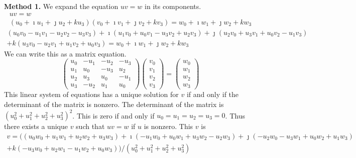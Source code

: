 {%
\begin{Solution}
  \label{solution quaternion}
  \textbf{Method 1.}
  We expand the equation $u v = w$ in its components.
  \begin{gather*}
    u v = w 
    \\
    \left( u_0 + \imath u_1 + \jmath u_2 + k u_3 \right) 
    \left(v_0 + \imath v_1 + \jmath v_2 + k v_3 \right) 
    = w_0 + \imath w_1 + \jmath w_2 + k w_3 
  \end{gather*}
  \begin{multline*}
    \left( u_0 v_0 - u_1 v_1 - u_2 v_2 - u_3 v_3 \right)
    + \imath \left( u_1 v_0 + u_0 v_1 - u_3 v_2 + u_2 v_3 \right)
    + \jmath \left( u_2 v_0 + u_3 v_1 + u_0 v_2 - u_1 v_3 \right) 
    \\
    + k \left( u_3 v_0 - u_2 v_1 + u_1 v_2 + u_0 v_3 \right)
    = w_0 + \imath w_1 + \jmath w_2 + k w_3 
  \end{multline*}
  We can write this as a matrix equation.
  \[
  \begin{pmatrix}
    u_0  & - u_1 & - u_2 & - u_3 \\
    u_1  &   u_0 & - u_3 &   u_2 \\
    u_2  &   u_3 &   u_0 & - u_1 \\
    u_3  & - u_2 &   u_1 &   u_0 
  \end{pmatrix}
  \begin{pmatrix}
    v_0 \\
    v_1 \\
    v_2 \\
    v_3
  \end{pmatrix}
  =
  \begin{pmatrix}
    w_0 \\
    w_1 \\
    w_2 \\
    w_3
  \end{pmatrix}
  \]
  This linear system of equations has a unique solution for $v$ if and only if 
  the determinant of the matrix is nonzero.  The determinant of the matrix is
  $\left( u_0^2 + u_1^2 + u_2^2 + u_3^2 \right)^2$.  This is zero if and 
  only if $u_0 = u_1 = u_2 = u_3 = 0$.  Thus there exists a unique $v$
  such that $u v = w$ if $u$ is nonzero.   This $v$ is
  \begin{multline*}
    v = \big( \left( u_0 w_0 + u_1 w_1 + u_2 w_2 + u_3 w_3 \right) 
    + \imath \left( - u_1 w_0 + u_0 w_1 + u_3 w_2 - u_2 w_3 \right) 
    + \jmath \left( - u_2 w_0 - u_3 w_1 + u_0 w_2 + u_1 w_3 \right) 
    \\
    + k \left( - u_3 w_0 + u_2 w_1 - u_1 w_2 + u_0 w_3 \right) \big) / 
    \left( u_0^2 + u_1^2 + u_2^2 + u_3^2 \right)
  \end{multline*}





\end{Solution}}
